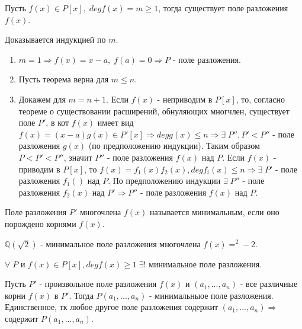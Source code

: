 \begin{proofs}
	Пусть $f(x) \in P[x],\; degf(x) = m \geq 1$, тогда существует поле разложения $f(x)$.
  \begin{dokvo}
    Доказывается индукцией по $m.\;$
    \begin{enumerate}
    \item $m = 1 \Rightarrow f(x) = x-a,\; f(a) = 0 \Rightarrow P$ - поле разложения.
    \item Пусть теорема верна для $m \leq n$.
    \item Докажем для $m = n + 1$. Если $f(x)$ - неприводим в $P[x]$, то, согласно теореме о существовании расширений, обнуляющих многчлен,
    существует поле $P'$, в кот $f(x)$ имеет вид $f(x) = (x-a)g(x) \in P'[x] \Rightarrow degg(x) \leq n \Rightarrow \exists\; P'', P' < P''$
    - поле разложения $g(x)$ (по предположению индукции). Таким образом $P < P' < P''$, значит $P''$ - поле разложения
    $f(x)$ над $P$. Если $f(x)$ - приводим в $P[x]$, то $f(x) = f_1(x)f_2(x), degf_i(x) \leq n \Rightarrow \exists\; P'$ - поле разложения
    $f_1()$ над $P$. По предположению индукции $\exists\; P''$ - поле разложения $f_2(x)$ над $P'\Rightarrow P''$ - поле разложения
    $f(x)$ над $P$.
  \end{enumerate}
	\end{dokvo}
\end{proofs}

\begin{defs}
  Поле разложения $P'$ многочлена $f(x)$ называется минимальным, если оно порождено корнями $f(x)$.
\end{defs}

\begin{example}
  $\mathbb{Q}(\sqrt{2})$ - минимальное поле разложения многочлена $f(x) = ^2 - 2$.
\end{example}

\begin{proofs}
	$\forall\; P$ и $f(x) \in P[x], degf(x) \geq 1\; \exists!$ минимальное поле разложения.
  \begin{dokvo}
    Пусть $P'$ - произвольное поле разложения $f(x)$ и $(a_1, ... , a_n)$ - все различные корни $f(x)$ в $P'$.
    Тогда $P(a_1, ... , a_n)$ - минимальныое поле разложения. Единственное, тк любое другое поле разложения содержит
    $(a_1, ... , a_n) \Rightarrow $ содержит $P(a_1, ... , a_n)$.
	\end{dokvo}
\end{proofs}

\newpage
